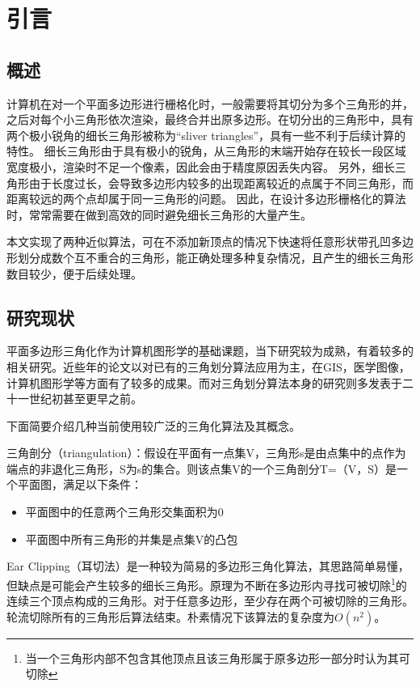 
\chapter{引言}

\section{概述}
  计算机在对一个平面多边形进行栅格化时，一般需要将其切分为多个三角形的并，之后对每个小三角形依次渲染，最终合并出原多边形。在切分出的三角形中，具有两个极小锐角的细长三角形被称为“sliver triangles”，具有一些不利于后续计算的特性。
  细长三角形由于具有极小的锐角，从三角形的末端开始存在较长一段区域宽度极小，渲染时不足一个像素，因此会由于精度原因丢失内容。
  另外，细长三角形由于长度过长，会导致多边形内较多的出现距离较近的点属于不同三角形，而距离较远的两个点却属于同一三角形的问题。
  因此，在设计多边形栅格化的算法时，常常需要在做到高效的同时避免细长三角形的大量产生。

  本文实现了两种近似算法，可在不添加新顶点的情况下快速将任意形状带孔凹多边形划分成数个互不重合的三角形，能正确处理多种复杂情况，且产生的细长三角形数目较少，便于后续处理。
\section{研究现状}

平面多边形三角化作为计算机图形学的基础课题，当下研究较为成熟，有着较多的相关研究。近些年的论文以对已有的三角划分算法应用为主，在GIS，医学图像，计算机图形学等方面有了较多的成果。而对三角划分算法本身的研究则多发表于二十一世纪初甚至更早之前。

下面简要介绍几种当前使用较广泛的三角化算法及其概念。

三角剖分（triangulation）：假设在平面有一点集V，三角形s是由点集中的点作为端点的非退化三角形，S为s的集合。则该点集V的一个三角剖分T=（V，S）是一个平面图，满足以下条件：
\begin{itemize}
  \item 平面图中的任意两个三角形交集面积为0
  \item 平面图中所有三角形的并集是点集V的凸包
\end{itemize}

Ear Clipping（耳切法）是一种较为简易的多边形三角化算法，其思路简单易懂，但缺点是可能会产生较多的细长三角形。原理为不断在多边形内寻找可被切除\footnote[1]{当一个三角形内部不包含其他顶点且该三角形属于原多边形一部分时认为其可切除}的连续三个顶点构成的三角形。对于任意多边形，至少存在两个可被切除的三角形。轮流切除所有的三角形后算法结束。朴素情况下该算法的复杂度为\(O(n^2)\)。

